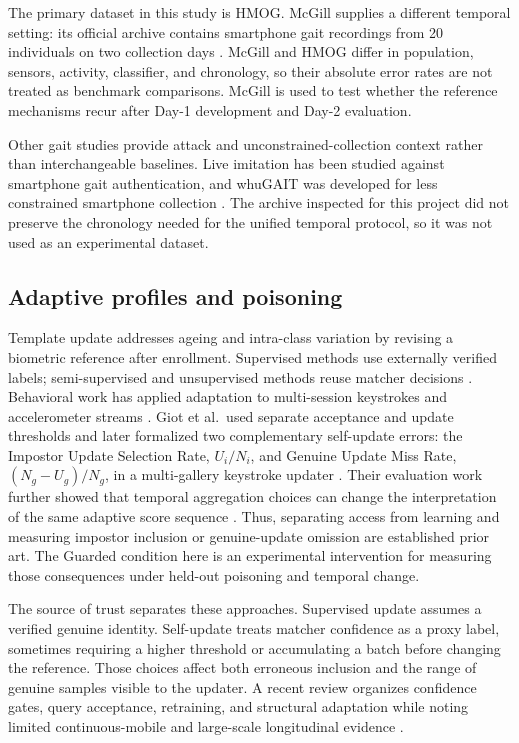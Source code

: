 \documentclass[technologies,article,submit,moreauthors]{Definitions/mdpi}
\begin{document}
The primary dataset in this study is HMOG. McGill supplies a different temporal setting: its official archive contains smartphone gait recordings from 20 individuals on two collection days \cite{Frank2010McGillGaitDataset,Frank2010ActivityGait}. McGill and HMOG differ in population, sensors, activity, classifier, and chronology, so their absolute error rates are not treated as benchmark comparisons. McGill is used to test whether the reference mechanisms recur after Day-1 development and Day-2 evaluation.

Other gait studies provide attack and unconstrained-collection context rather than interchangeable baselines. Live imitation has been studied against smartphone gait authentication, and whuGAIT was developed for less constrained smartphone collection \cite{Muaaz2017GaitImitation,Zou2020WhuGait}. The archive inspected for this project did not preserve the chronology needed for the unified temporal protocol, so it was not used as an experimental dataset.

\subsection{Adaptive profiles and poisoning}\label{sec:adaptive-profiles-and-poisoning}

Template update addresses ageing and intra-class variation by revising a biometric reference after enrollment. Supervised methods use externally verified labels; semi-supervised and unsupervised methods reuse matcher decisions \cite{Rattani2009TemplateUpdate,Didaci2014UnsupervisedUpdate}. Behavioral work has applied adaptation to multi-session keystrokes and accelerometer streams \cite{Giot2011KeystrokeUpdate,Pisani2017AccelerometerAdaptation}. Giot et al.~used separate acceptance and update thresholds and later formalized two complementary self-update errors: the Impostor Update Selection Rate, \(U_i/N_i\), and Genuine Update Miss Rate, \((N_g-U_g)/N_g\), in a multi-gallery keystroke updater \cite{Giot2012HybridTemplateUpdate}. Their evaluation work further showed that temporal aggregation choices can change the interpretation of the same adaptive score sequence \cite{Giot2012TemplateUpdateEvaluation}. Thus, separating access from learning and measuring impostor inclusion or genuine-update omission are established prior art. The Guarded condition here is an experimental intervention for measuring those consequences under held-out poisoning and temporal change.

The source of trust separates these approaches. Supervised update assumes a verified genuine identity. Self-update treats matcher confidence as a proxy label, sometimes requiring a higher threshold or accumulating a batch before changing the reference. Those choices affect both erroneous inclusion and the range of genuine samples visible to the updater. A recent review organizes confidence gates, query acceptance, retraining, and structural adaptation while noting limited continuous-mobile and large-scale longitudinal evidence \cite{Ryu2023AdaptiveBiometrics}.
\end{document}
